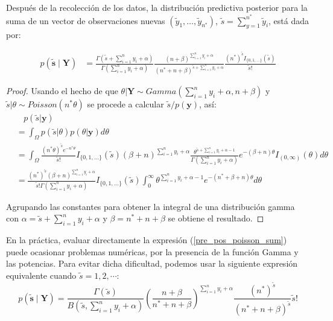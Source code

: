     \begin{Res}
    Despu\'es de la recolecci\'on de los datos, la distribuci\'on predictiva posterior para la suma de un vector de observaciones nuevas $\left(\tilde{y}_1,\ldots,\tilde{y}_{n^*}\right)$, $\tilde{s} = \sum_{y=1}^{n^*} \tilde{y}_i$, est\'a dada por:
    
    \begin{align}\label{pre_pos_poisson_sum}
    p(\tilde{\mathbf{s}} \mid \mathbf{Y})&=\frac{\Gamma(\tilde{s}+\sum_{i=1}^ny_i+\alpha)}{\Gamma(\sum_{i=1}^ny_i+\alpha)}
    \frac{(n+\beta)^{\sum_{i=1}^ny_i+\alpha}}{({n^*}+n+\beta)^{\tilde{s}+\sum_{i=1}^ny_i+\alpha}}\frac{(n^*)^{\tilde{s}}I_{\{0,1,\ldots\}}(\tilde{s})}{\tilde{s}!}
    \end{align}
    \end{Res}
    
    \begin{proof}
    Usando el hecho de que $\theta|\mathbf{Y}\sim Gamma(\sum_{i=1}^{n}y_i+\alpha,n+\beta)$ y $\tilde{s}|\theta\sim Poisson(n^*\theta)$ se procede a calcular $\tilde{s}/p(\mathbf{y})$,
    as\'i:
    \begin{align*}
    &\ \ \ \ p(\tilde{s}|\mathbf{y}) \\
    &= \int_{\Omega} p(\tilde{s}|\theta)p(\theta|\mathbf{y})d\theta\\
    & = \int_{\Omega} \frac{(n^{*}\theta)^{\tilde{s}}e^{-n^*\theta}}{\tilde{s}!} I_{\{0,1,\ldots\}}(\tilde{s}) (\beta+n)^{\sum_{i=1}^{n}y_i+\alpha}\frac{\theta^{\tilde{s}+\sum_{i=1}^{n}y_i+\alpha-1}}{\Gamma(\sum_{i=1}^{n}y_i+\alpha)}e^{-(\beta+n)\theta}I_{(0,\infty)}(\theta) d\theta\\
    &= \frac{(n^*)^{\tilde{s}}(\beta+n)^{\sum_{i=1}^{n}y_i+\alpha}}{\tilde{s}!\Gamma(\sum_{i=1}^{n}y_i+\alpha)}I_{\{0,1,\ldots\}}(\tilde{s})\int_{0}^{\infty}\theta^{\sum_{i=1}^{n}y_i+\alpha-1}e^{-(n^*+\beta+n)\theta}d\theta
    \end{align*}
    
    Agrupando las constantes para obtener la integral de una distribuci\'on gamma con $\alpha=\tilde{s}+\sum_{i=1}^{n}y_i+\alpha$ y $\beta=n^*+n+\beta$ se obtiene el resultado.
    \end{proof}
    
    En la pr\'actica, evaluar directamente la expresi\'on (\ref{pre_pos_poisson_sum}) puede ocasionar problemas num\'ericas, por la presencia de la funci\'on Gamma y las potencias. Para evitar dicha dificultad, podemos usar la siguiente expresi\'on equivalente cuando $\tilde{s}=1,2,\cdots$: 
    \begin{equation*}
    p(\tilde{\mathbf{s}} \mid \mathbf{Y})=\frac{\Gamma(\tilde{s})}{B(\tilde{s},\sum_{i=1}^ny_i+\alpha)}
    \left(\frac{n+\beta}{n^*+n+\beta}\right)^{\sum_{i=1}^ny_i+\alpha}\frac{(n^*)^{\tilde{s}}}{(n^*+n+\beta)^{\tilde{s}}}\tilde{s}!
    \end{equation*}
    
